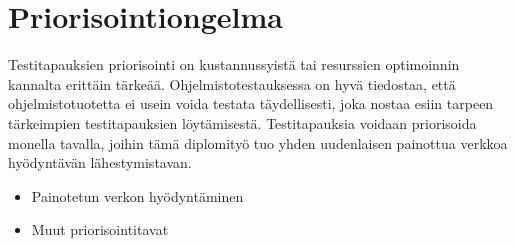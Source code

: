 \section{Priorisointiongelma}

Testitapauksien priorisointi on kustannussyistä tai resurssien optimoinnin kannalta erittäin tärkeää.
Ohjelmistotestauksessa on hyvä tiedostaa, että ohjelmistotuotetta ei usein voida testata täydellisesti, joka nostaa esiin tarpeen tärkeimpien testitapauksien löytämisestä.
Testitapauksia voidaan priorisoida monella tavalla, joihin tämä diplomityö tuo yhden uudenlaisen painottua verkkoa hyödyntävän lähestymistavan.
\begin{itemize}
  \item Painotetun verkon hyödyntäminen
  \item Muut priorisointitavat
\end{itemize}
